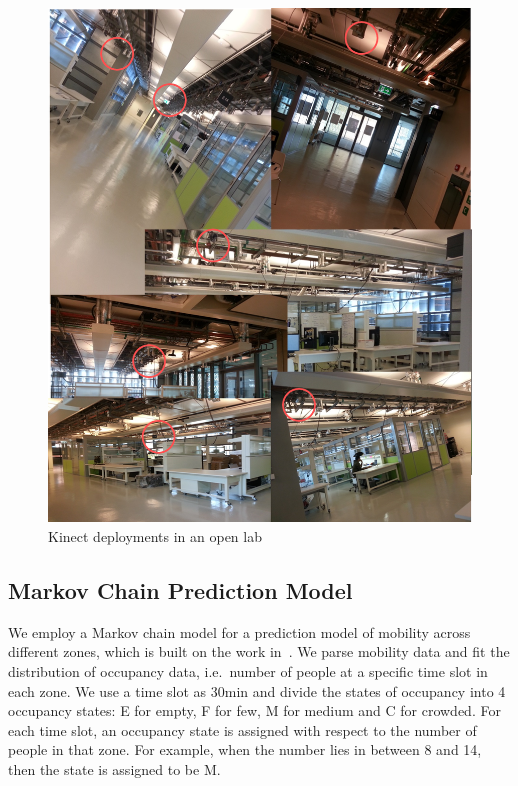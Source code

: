\documentclass{sig-alternate}
\begin{document}
\begin{figure}[!tb]
  \centering
  \includegraphics[scale=0.5]{realworld}
  \caption{Kinect deployments in an open lab}
  \label{fig:kinect-deployment}
\end{figure}



\subsection{Markov Chain Prediction Model}
\label{sec:mark-chain-pred}


We employ a Markov chain model for a prediction model of mobility
across different zones, which is built on the work
in~\cite{ref:Erickson:2009,ref:Erickson:2010}. We parse mobility data
and fit the distribution of occupancy data, i.e.\ number of people at
a specific time slot in each zone. We use a time slot as 30min and
divide the states of occupancy into 4 occupancy states: E for empty, F
for few, M for medium and C for crowded. For each time slot, an
occupancy state is assigned with respect to the number of people in
that zone. For example, when the number lies in between 8 and 14, then
the state is assigned to be M.  
\end{document}
